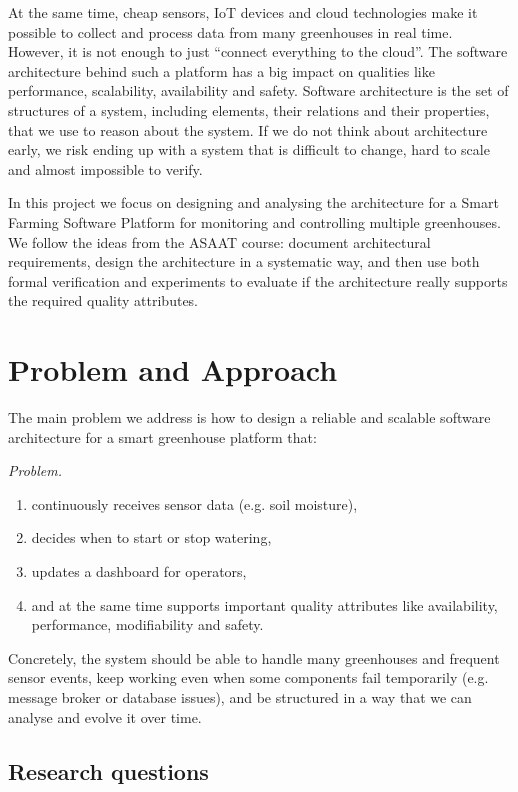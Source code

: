 \documentclass[conference]{IEEEtran}
\begin{document}
At the same time, cheap sensors, IoT devices and cloud technologies make it possible to collect and process data from many greenhouses in real time. However, it is not enough to just “connect everything to the cloud”. The software architecture behind such a platform has a big impact on qualities like performance, scalability, availability and safety. Software architecture is the set of structures of a system, including elements, their relations and their properties, that we use to reason about the system. If we do not think about architecture early, we risk ending up with a system that is difficult to change, hard to scale and almost impossible to verify.

In this project we focus on designing and analysing the architecture for a Smart Farming Software Platform for monitoring and controlling multiple greenhouses. We follow the ideas from the ASAAT course: document architectural requirements, design the architecture in a systematic way, and then use both formal verification and experiments to evaluate if the architecture really supports the required quality attributes.

\section{Problem and Approach}
The main problem we address is how to design a reliable and scalable software architecture for a smart greenhouse platform that:

\label{sec:problem}
\emph{Problem.}
\begin{enumerate}
    \item continuously receives sensor data (e.g. soil moisture),
    \item decides when to start or stop watering,
    \item updates a dashboard for operators,
    \item and at the same time supports important quality attributes like availability, performance, modifiability and safety.
\end{enumerate}

Concretely, the system should be able to handle many greenhouses and frequent sensor events, keep working even when some components fail temporarily (e.g. message broker or database issues), and be structured in a way that we can analyse and evolve it over time.


\subsection{Research questions}
\end{document}
